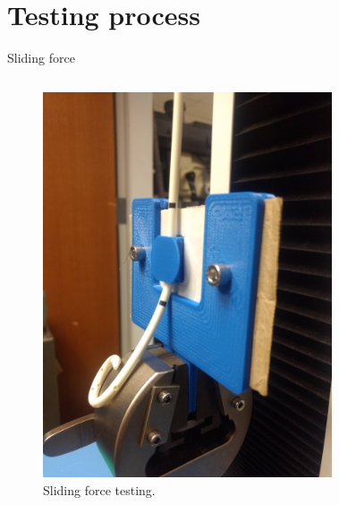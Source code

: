 \documentclass[10pt]{beamer}
\begin{document}
\section{Testing process}

\begin{frame}[fragile]{Sliding force}
\begin{columns}[T,onlytextwidth]
	\begin{figure}
	\vspace{1cm}
	\includegraphics[scale=0.03]{test-CTHD}
	\caption{Sliding force testing.}
	\end{figure}
	\begin{figure}
	\vspace{1cm}

\end{figure}
\end{columns}
\end{frame}
\end{document}
